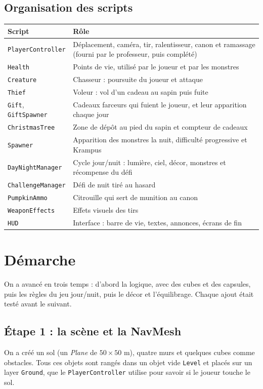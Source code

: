 \documentclass[11pt,a4paper]{article}
\begin{document}
\subsection{Organisation des scripts}
\begin{table}[H]
\centering
\begin{tabular}{lp{10.5cm}}
\toprule
\textbf{Script} & \textbf{Rôle} \\
\midrule
\texttt{PlayerController} & Déplacement, caméra, tir, ralentisseur, canon et ramassage (fourni par le professeur, puis complété) \\
\texttt{Health} & Points de vie, utilisé par le joueur et par les monstres \\
\texttt{Creature} & Chasseur : poursuite du joueur et attaque \\
\texttt{Thief} & Voleur : vol d'un cadeau au sapin puis fuite \\
\texttt{Gift}, \texttt{GiftSpawner} & Cadeaux farceurs qui fuient le joueur, et leur apparition chaque jour \\
\texttt{ChristmasTree} & Zone de dépôt au pied du sapin et compteur de cadeaux \\
\texttt{Spawner} & Apparition des monstres la nuit, difficulté progressive et Krampus \\
\texttt{DayNightManager} & Cycle jour/nuit : lumière, ciel, décor, monstres et récompense du défi \\
\texttt{ChallengeManager} & Défi de nuit tiré au hasard \\
\texttt{PumpkinAmmo} & Citrouille qui sert de munition au canon \\
\texttt{WeaponEffects} & Effets visuels des tirs \\
\texttt{HUD} & Interface : barre de vie, textes, annonces, écrans de fin \\
\bottomrule
\end{tabular}
\end{table}

\section{Démarche}

On a avancé en trois temps : d'abord la logique, avec des cubes et des capsules, puis les règles du jeu jour/nuit, puis le décor et l'équilibrage. Chaque ajout était testé avant le suivant. 
\subsection{Étape 1 : la scène et la NavMesh}
On a créé un sol (un \emph{Plane} de $50 \times 50$ m), quatre murs et quelques cubes comme obstacles. Tous ces objets sont rangés dans un objet vide \texttt{Level} et placés sur un layer \texttt{Ground}, que le \texttt{PlayerController} utilise pour savoir si le joueur touche le sol.
\end{document}
